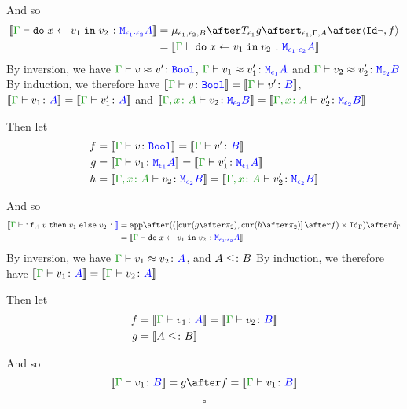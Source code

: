 \documentclass{report}
\begin{document}
And so
\begin{equation}
    \begin{split}
        \deno{\gtyperelation{\doin{x}{v_1}{v_2}}{\M{\e_1\dot\e_2}{A}}} & = \bind{\e_1}{\e_2}{B} \after \T{\e_1}{g} \after \tstrength{\e_1}{\G}{A} \after \pr{\idg}{f}\\
         & = \deno{\gtyperelation{\doin{x}{v_1}{v_2}}{\M{\e_1\dot\e_2}{A}}}
    \end{split}
\end{equation}
By inversion, we have $\gberelation{v}{v'}{\B}$, $\gberelation{v_1}{v_1'}{\M{\e_1}{A}}$ and $\gberelation{v_2}{v_2'}{\M{\e_2}{B}}$
By induction, we therefore have $\deno{\gtyperelation{v}{\B}} = \deno{\gtyperelation{v'}{B}}$, $\deno{\gtyperelation{v_1}{ A}}= \deno{\gtyperelation{v_1'}{ A}}$ and $\deno{\typerelation{\gax}{v_2}{\M{\e_2}{B}}} = \deno{\typerelation{\gax}{v_2'}{\M{\e_2}{B}}}$

Then let
\begin{align}
    f &{}=\deno{\gtyperelation{v}{\B}} = \deno{\gtyperelation{v'}{B}}\\
    g &{}=\deno{\gtyperelation{v_1}{\M{\e_1}{A}}}= \deno{\gtyperelation{v_1'}{\M{\e_1}{A}}}\\
    h &{}=\deno{\typerelation{\gax}{v_2}{\M{\e_2}{B}}} = \deno{\typerelation{\gax}{v_2'}{\M{\e_2}{B}}}
\end{align}



And so
\begin{equation}
    \begin{split}
        \deno{\gtyperelation{\pifthenelse{A}{v}{v_1}{v_2}}} & = \ifMorph{f}{g}{h}\\
         & = \deno{\gtyperelation{\doin{x}{v_1}{v_2}}{\M{\e_1\dot\e_2}{A}}}
    \end{split}
\end{equation}
By inversion, we have $\gberelation{v_1}{v_2}{A}$, and $A \leq\colon B$ 
By induction, we therefore have $\deno{\gtyperelation{v_1}{A}} = \deno{\gtyperelation{v_2}{A}}$

Then let
\begin{align}
    f &{}=\deno{\gtyperelation{v_1}{A}} = \deno{\gtyperelation{v_2}{B}}\\
    g &{}=\deno{A \subtype B}
\end{align}



And so
\begin{equation}
        \deno{\gtyperelation{v_1}{B}} = g \after f = \deno{\gtyperelation{v_1}{B}}
\end{equation}

$$\square$$
\end{document}
